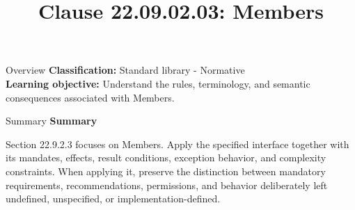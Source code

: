 \documentclass[10pt,letterpaper]{article}
\title{Clause 22.09.02.03: Members}
\author{}
\date{}
\begin{document}
\maketitle
\begin{CornellOverviewBox}{Overview}
\textbf{Classification:} Standard library - Normative\\[2pt]
\textbf{Learning objective:} Understand the rules, terminology, and semantic consequences associated with Members.
\end{CornellOverviewBox}\begin{CornellSummaryBox}{Summary}
{\sffamily\bfseries\color{Accent} Summary}\par\vspace{3pt}Section 22.9.2.3 focuses on Members. Apply the specified interface together with its mandates, effects, result conditions, exception behavior, and complexity constraints. When applying it, preserve the distinction between mandatory requirements, recommendations, permissions, and behavior deliberately left undefined, unspecified, or implementation-defined.
\end{CornellSummaryBox}
\end{document}
